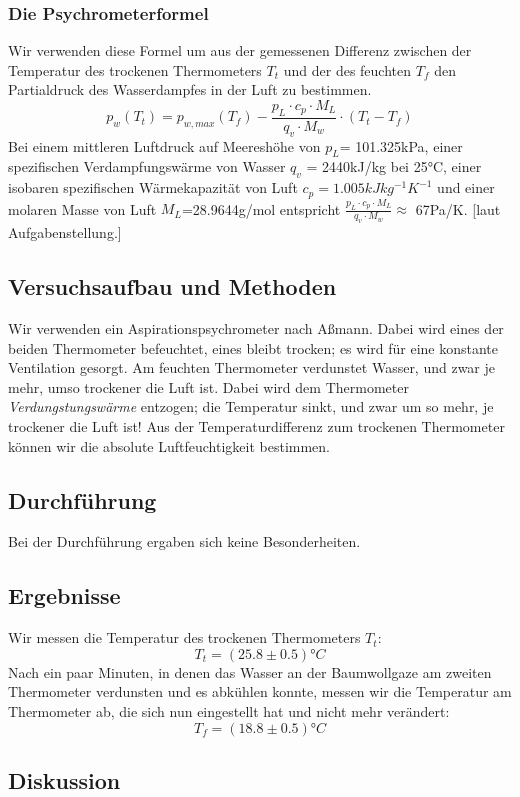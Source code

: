 \documentclass{article}
\begin{document}
\subsubsection*{Die Psychrometerformel}
Wir verwenden diese Formel um aus der gemessenen Differenz zwischen der Temperatur des trockenen Thermometers $T_t$ und der des feuchten $T_f$ den Partialdruck des Wasserdampfes in der Luft zu bestimmen.
\begin{equation}
\label{psychrometerformel}
p_w(T_t)=p_{w,max}(T_f)-\frac{p_L\cdot c_p \cdot M_L}{q_v\cdot M_w} \cdot (T_t - T_f)
\end{equation}
Bei einem mittleren Luftdruck auf Meereshöhe von $p_L$= 101.325kPa, einer spezifischen Verdampfungswärme von Wasser $q_v$ = 2440kJ/kg bei 25°C, einer isobaren spezifischen Wärmekapazität von Luft $c_p=1.005kJkg^{-1}K^{-1}$ und einer molaren Masse von Luft $M_L$=28.9644g/mol entspricht $\frac{p_L\cdot c_p \cdot M_L}{q_v\cdot M_w} \approx $ 67Pa/K. [laut Aufgabenstellung.]
\subsection{Versuchsaufbau und Methoden}
Wir verwenden ein Aspirationspsychrometer nach Aßmann. Dabei wird eines der beiden Thermometer befeuchtet, eines bleibt trocken; es wird für eine konstante Ventilation gesorgt. Am feuchten Thermometer verdunstet Wasser, und zwar je mehr, umso trockener die Luft ist. Dabei wird dem Thermometer \textit{Verdungstungswärme} entzogen; die Temperatur sinkt, und zwar um so mehr, je trockener die Luft ist! Aus der Temperaturdifferenz zum trockenen Thermometer können wir die absolute Luftfeuchtigkeit bestimmen. 
\subsection{Durchführung}
Bei der Durchführung ergaben sich keine Besonderheiten. 
\subsection{Ergebnisse}
Wir messen die Temperatur des trockenen Thermometers $T_t$:
$$T_t=(25.8 \pm 0.5)°C$$
Nach ein paar Minuten, in denen das Wasser an der Baumwollgaze am zweiten Thermometer verdunsten und es abkühlen konnte, messen wir die Temperatur am Thermometer ab, die sich nun eingestellt hat und nicht mehr verändert:
$$T_f=(18.8 \pm 0.5)°C $$ 
\subsection{Diskussion}
\end{document}
